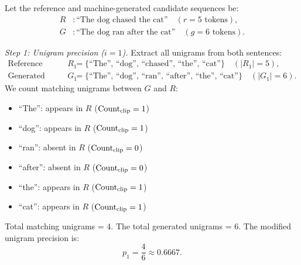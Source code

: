 \documentclass[../../../main.tex]{subfiles}
\begin{document}
Let the reference and machine-generated candidate sequences be:
\begin{align*}
R &: \text{``The dog chased the cat''} \quad (r = 5 \text{ tokens}), \\
G &: \text{``The dog ran after the cat''} \quad (g = 6 \text{ tokens}).
\end{align*}

\textit{Step 1: Unigram precision ($i = 1$).}
Extract all unigrams from both sentences:
\begin{align*}
\text{Reference unigrams } R_1 &= \{\text{``The''}, \, \text{``dog''}, \, \text{``chased''}, \, \text{``the''}, \, \text{``cat''}\} \quad (|R_1| = 5), \\
\text{Generated unigrams } G_1 &= \{\text{``The''}, \, \text{``dog''}, \, \text{``ran''}, \, \text{``after''}, \, \text{``the''}, \, \text{``cat''}\} \quad (|G_1| = 6).
\end{align*}
We count matching unigrams between $G$ and $R$:
\begin{itemize}
    \item ``The'': appears in $R$ ($\operatorname{Count}_{\text{clip}} = 1$)
    \item ``dog'': appears in $R$ ($\operatorname{Count}_{\text{clip}} = 1$)
    \item ``ran'': absent in $R$ ($\operatorname{Count}_{\text{clip}} = 0$)
    \item ``after'': absent in $R$ ($\operatorname{Count}_{\text{clip}} = 0$)
    \item ``the'': appears in $R$ ($\operatorname{Count}_{\text{clip}} = 1$)
    \item ``cat'': appears in $R$ ($\operatorname{Count}_{\text{clip}} = 1$)
\end{itemize}
Total matching unigrams = 4. The total generated unigrams = 6. The modified unigram precision is:
\begin{equation}
p_1 = \frac{4}{6} \approx \mathbf{0.6667}.
\end{equation}
\end{document}
